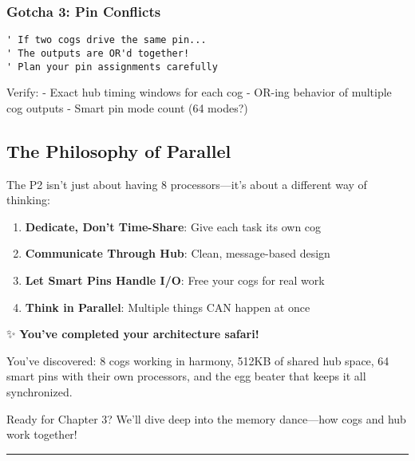 \documentclass[11pt]{book}
\providecommand{\tightlist}{%
  \setlength{\itemsep}{0pt}\setlength{\parskip}{0pt}}
\begin{document}
\hypertarget{gotcha-3-pin-conflicts}{%
\subsubsection{Gotcha 3: Pin Conflicts}\label{gotcha-3-pin-conflicts}}

\begin{lstlisting}
' If two cogs drive the same pin...
' The outputs are OR'd together!
' Plan your pin assignments carefully
\end{lstlisting}

\begin{review}
Verify:
- Exact hub timing windows for each cog
- OR-ing behavior of multiple cog outputs
- Smart pin mode count (64 modes?)
\end{review}

\hypertarget{the-philosophy-of-parallel}{%
\subsection{The Philosophy of
Parallel}\label{the-philosophy-of-parallel}}

The P2 isn't just about having 8 processors---it's about a different way
of thinking:

\begin{enumerate}
\def\labelenumi{\arabic{enumi}.}
\tightlist
\item
  \textbf{Dedicate, Don't Time-Share}: Give each task its own cog
\item
  \textbf{Communicate Through Hub}: Clean, message-based design
\item
  \textbf{Let Smart Pins Handle I/O}: Free your cogs for real work
\item
  \textbf{Think in Parallel}: Multiple things CAN happen at once
\end{enumerate}

\begin{chapterend}
✨ \textbf{You've completed your architecture safari!}

You've discovered: 8 cogs working in harmony, 512KB of shared hub space, 64 smart pins with their own processors, and the egg beater that keeps it all synchronized.

\chapterseparator

Ready for Chapter 3? We'll dive deep into the memory dance—how cogs and hub work together!
\end{chapterend}

\begin{center}\rule{0.5\linewidth}{0.5pt}\end{center}
\end{document}
